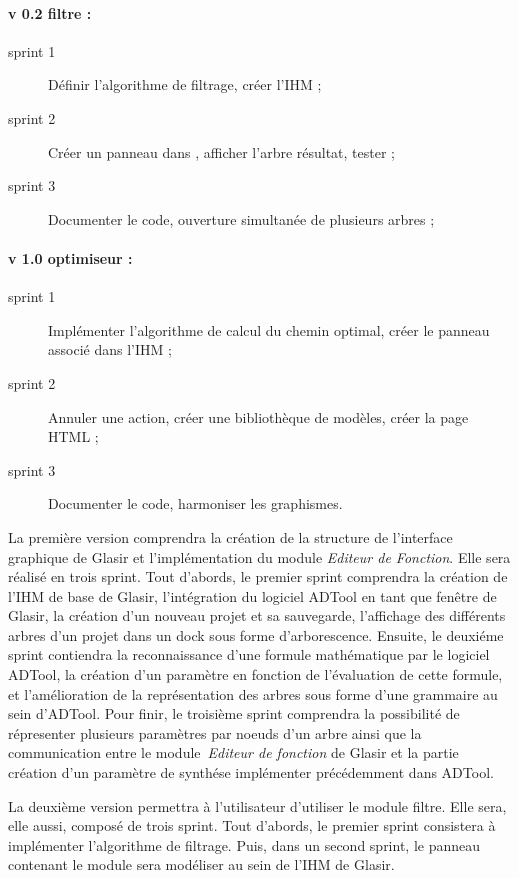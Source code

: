	\paragraph{v 0.2 filtre :} 
		\begin{description}
			\item[sprint 1] Définir l'algorithme de filtrage, créer l'IHM ;
			\item[sprint 2] Créer un panneau dans \glasir{}, afficher l'arbre résultat, tester ;
			\item[sprint 3] Documenter le code, ouverture simultanée de plusieurs arbres ;
		\end{description}
	\paragraph{v 1.0 optimiseur : }
		\begin{description}
			\item[sprint 1] Implémenter l'algorithme de calcul du chemin optimal, créer le panneau associé dans l'IHM ;
			\item[sprint 2] Annuler une action, créer une bibliothèque de modèles, créer la page HTML ;
			\item[sprint 3] Documenter le code, harmoniser les graphismes.
		\end{description}


		La première version comprendra la création de la structure de l'interface graphique de Glasir et l'implémentation du module \emph{Editeur de Fonction}. Elle sera réalisé en trois sprint. Tout d'abords, le premier sprint comprendra la création de l'IHM de base de Glasir, l'intégration du logiciel ADTool en tant que fenêtre de Glasir, la création d'un nouveau projet et sa sauvegarde, l'affichage des différents arbres d'un projet dans un dock sous forme d'arborescence. Ensuite, le deuxiéme sprint contiendra la reconnaissance d'une formule mathématique par le logiciel ADTool, la création d'un paramètre en fonction de l'évaluation de cette formule, et l'amélioration de la représentation des arbres sous forme d'une grammaire au sein d'ADTool. Pour finir, le troisième sprint comprendra la possibilité de répresenter plusieurs paramètres par noeuds d'un arbre ainsi que la communication entre le module \emph{Editeur de fonction} de Glasir et la partie création d'un paramètre de synthése implémenter précédemment dans ADTool. 


		La deuxième version permettra à l'utilisateur d'utiliser le module filtre. Elle sera, elle aussi, composé de trois sprint. Tout d’abords, le premier sprint consistera à implémenter l'algorithme de filtrage. Puis, dans un second sprint, le panneau contenant le module sera modéliser au sein de l'IHM de Glasir. 

